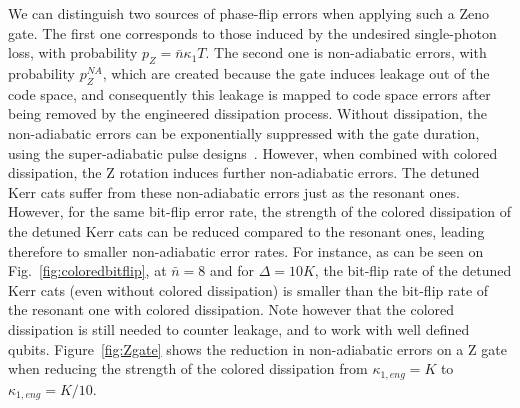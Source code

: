\documentclass[%
 reprint,
 superscriptaddress,
 amsmath,
 amssymb,
 aps,
 pra,
 10pt
]{revtex4-2}
\newcommand{\nbar}{\bar{n}}
\begin{document}
We can distinguish two sources of phase-flip errors when applying such a Zeno gate. The first one corresponds to those induced by the undesired single-photon loss, with probability $p_Z = \nbar \kappa_1 T$. The second one is non-adiabatic errors, with probability $p_Z^{NA}$, which are created because the gate induces leakage out of the code space, and consequently this leakage is mapped to code space  errors after being removed by the engineered dissipation process. Without dissipation, the non-adiabatic errors can be exponentially suppressed with the gate duration, using the super-adiabatic pulse designs~\cite{Xu2021}. However, when combined with colored dissipation, the Z rotation induces further non-adiabatic errors. The detuned Kerr cats suffer from these non-adiabatic errors just as the resonant ones. However, for the same bit-flip error rate, the strength of the colored dissipation of the detuned Kerr cats can be reduced compared to the resonant ones, leading therefore to smaller non-adiabatic error rates. For instance, as can be seen on Fig.~\ref{fig:coloredbitflip}, at $\nbar = 8$ and for $\Delta = 10K$, the bit-flip rate of the detuned Kerr cats (even without colored dissipation) is smaller than the bit-flip rate of the resonant one with colored dissipation. Note however that the colored dissipation is still needed to counter leakage, and to work with well defined qubits. Figure~\ref{fig:Zgate} shows the reduction in non-adiabatic errors on a Z gate when reducing the strength of the colored dissipation from $\kappa_{1,eng}=K$ to $\kappa_{1,eng}=K/10$. 
\end{document}
